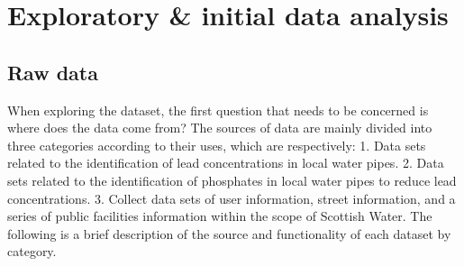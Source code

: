 \documentclass[11pt,twoside]{article}
\numberwithin{Theorem}{section}
\numberwithin{Definition}{section}
\numberwithin{Lemma}{section}
\numberwithin{Algorithm}{section}
\numberwithin{equation}{section}
\begin{document}
\clearpage

\section{Exploratory \& initial data analysis}
\label{sec.explore}

\subsection{Raw data}
\label{sec:raw}
When exploring the dataset, the first question that needs to be concerned is where does the data come from? The sources of data are mainly divided into three categories according to their uses, which are respectively: 1. Data sets related to the identification of lead concentrations in local water pipes. 2. Data sets related to the identification of phosphates in local water pipes to reduce lead concentrations. 3. Collect data sets of user information, street information, and a series of public facilities information within the scope of Scottish Water. The following is a brief description of the source and functionality of each dataset by category.
\end{document}
